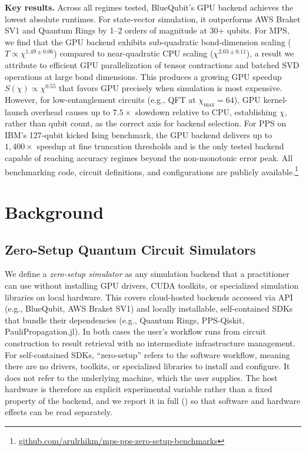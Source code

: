 \documentclass[conference,10pt]{IEEEtran}
\newcommand{\repo}{\href{https://github.com/arulrhikm/mps-pps-zero-setup-benchmarks}{github.com/arulrhikm/mps-pps-zero-setup-benchmarks}}
\begin{document}
\textbf{Key results.} Across all regimes tested, BlueQubit's GPU backend achieves the lowest absolute runtimes. For state-vector simulation, it outperforms AWS Braket SV1 and Quantum Rings by 1--2 orders of magnitude at 30+ qubits. For MPS, we find that the GPU backend exhibits sub-quadratic bond-dimension scaling ($T \propto \chi^{1.49 \pm 0.06}$) compared to near-quadratic CPU scaling ($\chi^{2.03 \pm 0.11}$), a result we attribute to efficient GPU parallelization of tensor contractions and batched SVD operations at large bond dimensions. This produces a growing GPU speedup $S(\chi) \propto \chi^{0.55}$ that favors GPU precisely when simulation is most expensive. However, for low-entanglement circuits (e.g., QFT at $\chi_{\max} = 64$), GPU kernel-launch overhead causes up to $7.5\times$ slowdown relative to CPU, establishing $\chi$, rather than qubit count, as the correct axis for backend selection. For PPS on IBM's 127-qubit kicked Ising benchmark, the GPU backend delivers up to $1{,}400\times$ speedup at fine truncation thresholds and is the only tested backend capable of reaching accuracy regimes beyond the non-monotonic error peak. All benchmarking code, circuit definitions, and configurations are publicly available.\footnote{\repo}

    \section{Background}
    \label{sec:background}

    \subsection{Zero-Setup Quantum Circuit Simulators}
 
    We define a \emph{zero-setup simulator} as any simulation backend that a practitioner can use without installing GPU drivers, CUDA toolkits, or specialized simulation libraries on local hardware. This covers cloud-hosted backends accessed via API (e.g., BlueQubit, AWS Braket SV1) and locally installable, self-contained SDKs that bundle their dependencies (e.g., Quantum Rings, PPS-Qiskit, PauliPropagation.jl). In both cases the user's workflow runs from circuit construction to result retrieval with no intermediate infrastructure management. For self-contained SDKs, ``zero-setup'' refers to the software workflow, meaning there are no drivers, toolkits, or specialized libraries to install and configure. It does not refer to the underlying machine, which the user supplies. The host hardware is therefore an explicit experimental variable rather than a fixed property of the backend, and we report it in full () so that software and hardware effects can be read separately.
\end{document}
